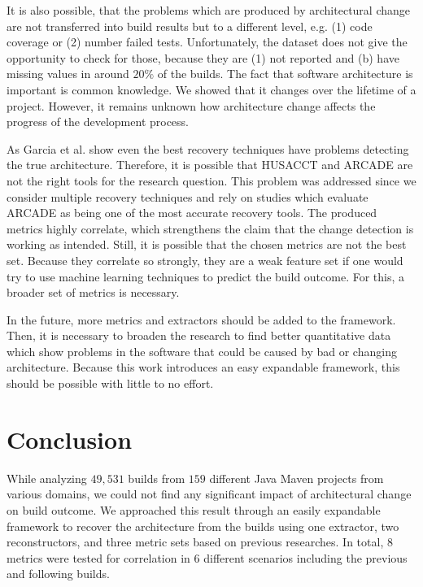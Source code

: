 \documentclass[sigplan, anonymous, review]{acmart}
\begin{document}
It is also possible, that the problems which are produced by architectural change are not transferred into build results but to a different level, e.g. (1) code coverage or (2) number failed tests. Unfortunately, the dataset does not give the opportunity to check for those, because they are (1) not reported and (b) have missing values in around $20\%$ of the builds. The fact that software architecture is important is common knowledge. We showed that it changes over the lifetime of a project. However, it remains unknown how architecture change affects the progress of the development process.

As Garcia et al. \cite{arcRec-comparison} show even the best recovery techniques have problems detecting the true architecture. Therefore, it is possible that HUSACCT and ARCADE are not the right tools for the research question. This problem was addressed since we consider multiple recovery techniques and rely on studies which evaluate ARCADE as being one of the most accurate recovery tools. The produced metrics highly correlate, which strengthens the claim that the change detection is working as intended. Still, it is possible that the chosen metrics are not the best set. Because they correlate so strongly, they are a weak feature set if one would try to use machine learning techniques to predict the build outcome. For this, a broader set of metrics is necessary. 

In the future, more metrics and extractors should be added to the framework. Then, it is necessary to broaden the research to find better quantitative data which show problems in the software that could be caused by bad or changing architecture. Because this work introduces an easy expandable framework, this should be possible with little to no effort.

\section{Conclusion}

While analyzing $49,531$ builds from $159$ different Java Maven projects from various domains, we could not find any significant impact of architectural change on build outcome.
We approached this result through an easily expandable framework to recover the architecture from the builds using one extractor, two reconstructors, and three metric sets based on previous researches. In total, $8$ metrics were tested for correlation in $6$ different scenarios including the previous and following builds. 
\end{document}
